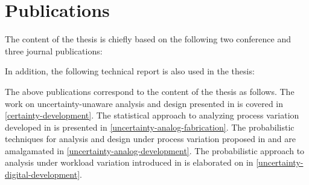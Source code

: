 \section{Publications}

The content of the thesis is chiefly based on the following two conference and
three journal publications:

\printbibliography[heading=none,keyword=own]

In addition, the following technical report is also used in the thesis:

\printbibliography[heading=none,keyword=own-unpublished]

The above publications correspond to the content of the thesis as follows. The
work on uncertainty-unaware analysis and design presented in \cite{ukhov2012} is
covered in \cref{certainty-development}. The statistical approach to analyzing
process variation developed in \cite{ukhov2014a} is presented in
\cref{uncertainty-analog-fabrication}. The probabilistic techniques for analysis
and design under process variation proposed in \cite{ukhov2014b} and
\cite{ukhov2015} are amalgamated in \cref{uncertainty-analog-development}. The
probabilistic approach to analysis under workload variation introduced in
\cite{ukhov2017a} is elaborated on in \cref{uncertainty-digital-development}.
